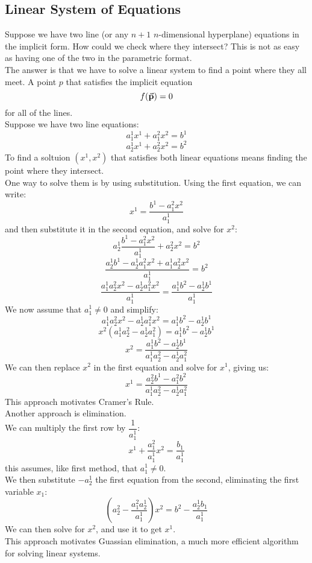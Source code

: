 \documentclass[12pt]{article}
\begin{document}
    \newpage

    \subsection*{Linear System of Equations}

    Suppose we have two line
    (or any $n+1$ $n$-dimensional hyperplane)
    equations in the implicit form.
    How could we check where they intersect?
    This is not as easy as having one of the two
    in the parametric format. \\
    The answer is that we have to solve a linear
    system to find a point where they all meet.
    A point $p$ that satisfies the implicit
    equation
    \[ f(\vec{\mathbf{p}}) = 0 \]
    for all of the lines. \\

    Suppose we have two line equations:
    \[ a_1^1x^1 + a_1^2x^2 = b^1 \]
    \[ a_2^1x^1 + a_2^2x^2 = b^2 \]
    To find a soltuion $(x^1, x^2)$ 
    that satisfies both linear equations
    means finding the point where they intersect. \\

    One way to solve them is by using substitution.
    Using the first equation, we can write:
    \[ x^1 = \dfrac{b^1 - a_1^2x^2}{a_1^1} \]
    and then substitute it in the second equation,
    and solve for $x^2$:
    \[ a_2^1\dfrac{b^1 - a_1^2x^2}{a_1^1} + a_2^2x^2 = b^2 \]
    \[ \dfrac{a_2^1b^1 - a_2^1a_1^2x^2 
    + a_1^1a_2^2x^2}{a_1^1} = b^2 \]
    \[ \dfrac{a_1^1a_2^2x^2 - a_2^1a_1^2x^2}{a_1^1} = 
    \dfrac{a_1^1b^2 - a_2^1b^1}{a_1^1} \]
    We now assume that $a_1^1 \neq 0$ and simplify:
    \[ a_1^1a_2^2x^2 - a_2^1a_1^2x^2 = 
    a_1^1b^2 - a_2^1b^1 \]
    \[ x^2(a_1^1a_2^2 - a_2^1a_1^2) = 
    a_1^1b^2 - a_2^1b^1 \]
    \[ x^2 = 
    \dfrac{a_1^1b^2 - a_2^1b^1}{a_1^1a_2^2 - a_2^1a_1^2} \]
    We can then replace $x^2$ in the first equation
    and solve for $x^1$, giving us:
    \[ x^1 = 
    \dfrac{a_2^2b^1 - a_1^2b^2}{a_1^1a_2^2 - a_2^1a_1^2} \]
    This approach motivates Cramer's Rule. \\

    Another approach is elimination. \\
    We can multiply the first row by $\dfrac{1}{a_1^1}$:
    \[ x^1 + \dfrac{a_1^2}{a_1^1}x^2 = \dfrac{b_1}{a_1^1} \]
    this assumes, like first method, that $a_1^1 \neq 0$. \\
    We then substitute $-a_2^1$ the first equation
    from the second, eliminating the first variable $x_1$:
    \[ (a_2^2 - \dfrac{a_1^2a_2^1}{a_1^1}) x^2 = 
    b^2 - \dfrac{a_2^1b_1}{a_1^1} \]
    We can then solve for $x^2$,
    and use it to get $x^1$. \\
    This approach motivates Guassian elimination,
    a much more efficient algorithm for solving
    linear systems. \\
\end{document}
